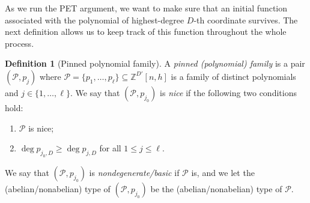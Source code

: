 \documentclass[11pt]{amsart}
\theoremstyle{definition}
\newtheorem{definition}[lemma]{Definition}
\newcommand{\Z}{{\mathbb Z}}
\newcommand{\CP}{{\mathcal P}}
\newcommand{\1}{{\mathbf{1}}}
\begin{document}
     As we run the PET argument, we want to make sure that an initial function associated with the polynomial of highest-degree $D$-th coordinate survives. The next definition allows us to keep track of this function throughout the whole process.
     \begin{definition}[Pinned polynomial family]
     A \emph{pinned (polynomial) family} is a pair $(\mathcal{P},p_{j})$ where $\mathcal{P}=\{p_{1},\dots,p_{\ell}\}\subseteq\Z^{D'}[n,h]$ is a family of distinct polynomials and $j\in \{1,\dots,\ell\}$. We say that $(\mathcal{P},p_{j_0})$ is \emph{nice} if the following two conditions hold:
     \begin{enumerate}
         \item {$\CP$ is nice;}
         \item $\deg p_{j_0,D}\geq \deg p_{j,D}$ for all $1\leq j\leq \ell$.    
     \end{enumerate}
          We say that $(\CP, p_{j_0})$ is \textit{nondegenerate/basic} if $\CP$ is, and we let the (abelian/nonabelian) type of $(\CP, p_{j_0})$ be the (abelian/nonabelian) type of $\CP$.
     \end{definition}
\end{document}
